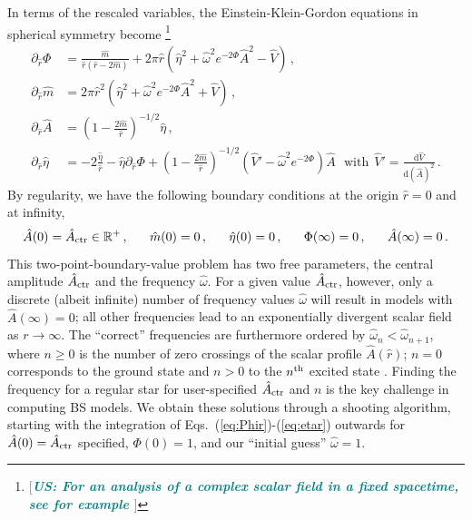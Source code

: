\documentclass[]{iopart}
\newcommand{\du}{\mathrm{d}}
\newcommand{\us}[1]{\textcolor{teal}{[{\it\textbf{US: #1}}]} }
\begin{document}
%
In terms of the rescaled variables, the Einstein-Klein-Gordon
equations in spherical symmetry become
\footnote{
\us{For an analysis of a complex scalar field in a fixed spacetime,
see for example \cite{Khlopov:1985jw}}
}
%
\begin{align}
  \partial_{\hat{r}}\Phi &=
  \frac{\hat{m}}{\hat{r}(\hat{r}-2\hat{m})}
  +
  2\pi \hat{r}
  \left(
  \hat{\eta}^2
  +\hat{\omega}^2e^{-2\Phi}\hat{A}^2
  -\hat{V}
  \right)\,, \label{eq:Phir} \\
  \partial_{\hat{r}}\hat{m} &=
  2\pi \hat{r}^2
  \left(
  \hat{\eta}^2
  +\hat{\omega}^2e^{-2\Phi}\hat{A}^2
  +\hat{V}
  \right)\,,
  \\
  \partial_{\hat{r}}\hat{A} &=
  \left(
  1-\frac{2\hat{m}}{\hat{r}}
  \right)^{-1/2}
  \hat{\eta}\,, \\
  \partial_{\hat{r}} \hat{\eta} &=
  -2\frac{\hat{\eta}}{\hat{r}}
  -\hat{\eta}\partial_{\hat{r}}\Phi
  +\left(
  1-\frac{2\hat{m}}{\hat{r}}
  \right)^{-1/2}
  (\hat{V}'-\hat{\omega}^2e^{-2\Phi})\hat{A}~~~
  \text{with}~~
  \hat{V}'=\frac{\du \hat{V}}{\du (\hat{A})^2}\,.
  \label{eq:etar}
\end{align}
%
By regularity, we have the following boundary conditions at the
origin $\hat{r}=0$ and at infinity,
%
\begin{equation}
  \hat{A}(0) = \hat{A}_{\rm ctr} \in \mathbb{R}^+\,,~~~~~
  \hat{m}(0) = 0\,,~~~~~
  \hat{\eta}(0) = 0\,,~~~~~
  \Phi(\infty) = 0\,,~~~~~
  \hat{A}(\infty) = 0\,.
\end{equation}
%
This two-point-boundary-value problem has two free parameters, the
central amplitude $\hat{A}_{\rm ctr}$ and the frequency $\hat{\omega}$.
For a given value $\hat{A}_{\rm ctr}$, however, only a discrete
(albeit infinite) number of frequency values $\hat{\omega}$ will
result in models with $\hat{A}(\infty)=0$; all other frequencies
lead to an exponentially divergent scalar field as $r\rightarrow
\infty$. The ``correct'' frequencies are furthermore ordered by
$\hat{\omega}_n<\hat{\omega}_{n+1}$, where $n\ge 0$ is the number
of zero crossings of the scalar profile $\hat{A}(\hat{r})$; $n=0$
corresponds to the ground state and $n>0$ to the $n^{\rm th}$ excited
state \cite{Balakrishna:1997ej}.  Finding the frequency for a regular
star for user-specified $\hat{A}_{\rm ctr}$ and $n$ is the key
challenge in computing BS models. We obtain these solutions through
a shooting algorithm, starting with the integration of
Eqs.~(\ref{eq:Phir})-(\ref{eq:etar}) outwards for $\hat{A}(0)=\hat{A}_{\rm
ctr}$ specified, $\Phi(0)=1$, and our ``initial guess'' $\hat{\omega}=1$.
\end{document}

